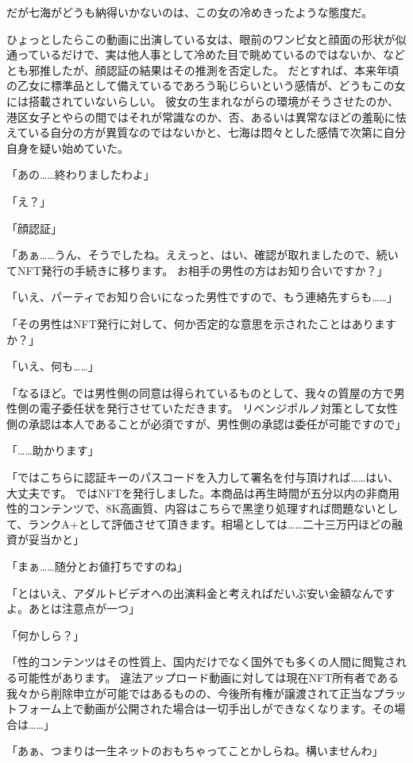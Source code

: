 だが七海がどうも納得いかないのは、この女の冷めきったような態度だ。

ひょっとしたらこの動画に出演している女は、眼前のワンピ女と顔面の形状が似通っているだけで、実は他人事として冷めた目で眺めているのではないか、などとも邪推したが、顔認証の結果はその推測を否定した。
だとすれば、本来年頃の乙女に標準品として備えているであろう恥じらいという感情が、どうもこの女には搭載されていないらしい。
彼女の生まれながらの環境がそうさせたのか、港区女子とやらの間ではそれが常識なのか、否、あるいは異常なほどの羞恥に怯えている自分の方が異質なのではないかと、七海は悶々とした感情で次第に自分自身を疑い始めていた。

「あの……終わりましたわよ」

「え？」

「顔認証」

「あぁ……うん、そうでしたね。ええっと、はい、確認が取れましたので、続いてNFT発行の手続きに移ります。
お相手の男性の方はお知り合いですか？」

「いえ、パーティでお知り合いになった男性ですので、もう連絡先すらも……」

「その男性はNFT発行に対して、何か否定的な意思を示されたことはありますか？」

「いえ、何も……」

「なるほど。では男性側の同意は得られているものとして、我々の質屋の方で男性側の電子委任状を発行させていただきます。
リベンジポルノ対策として女性側の承認は本人であることが必須ですが、男性側の承認は委任が可能ですので」

「……助かります」

「ではこちらに認証キーのパスコードを入力して署名を付与頂ければ……はい、大丈夫です。
ではNFTを発行しました。本商品は再生時間が五分以内の非商用性的コンテンツで、8K高画質、内容はこちらで黒塗り処理すれば問題ないとして、ランクA+として評価させて頂きます。相場としては……二十三万円ほどの融資が妥当かと」

「まぁ……随分とお値打ちですのね」

「とはいえ、アダルトビデオへの出演料金と考えればだいぶ安い金額なんですよ。あとは注意点が一つ」

「何かしら？」

「性的コンテンツはその性質上、国内だけでなく国外でも多くの人間に閲覧される可能性があります。
違法アップロード動画に対しては現在NFT所有者である我々から削除申立が可能ではあるものの、今後所有権が譲渡されて正当なプラットフォーム上で動画が公開された場合は一切手出しができなくなります。その場合は……」

「あぁ、つまりは一生ネットのおもちゃってことかしらね。構いませんわ」

